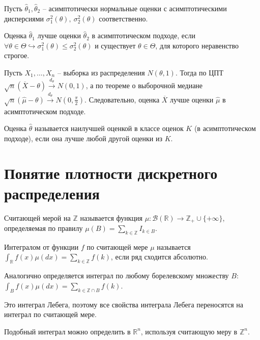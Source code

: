     Пусть $\displaystyle \hat{\theta }_{1} ,\hat{\theta }_{2}$ -- асимптотически нормальные оценки с асимптотическими дисперсиями $\displaystyle \sigma _{1}^{2}( \theta ) ,\ \sigma _{2}^{2}( \theta )$ соответственно.
    \begin{definition}
    Оценка $\displaystyle \hat{\theta }_{1}$ лучше оценки $\displaystyle \hat{\theta }_{2}$ в асимптотическом подходе, если $\displaystyle \forall \theta \in \Theta \hookrightarrow \sigma _{1}^{2}( \theta ) \leqslant \sigma _{2}^{2}( \theta )$ и существует $\displaystyle \theta \in \Theta $, для которого неравенство строгое.
    \end{definition}
    \begin{example}
    Пусть $\displaystyle X_{1} ,\dotsc ,X_{n}$ -- выборка из распределения $\displaystyle N( \theta ,1)$. Тогда по ЦПТ $\displaystyle \sqrt{n}(\overline{X} -\theta )\xrightarrow{d_{\theta }} N( 0,1)$, а по теореме о выборочной медиане $\displaystyle \sqrt{n}(\hat{\mu } -\theta )\xrightarrow{d_{\theta }} N\left( 0,\frac{\pi }{2}\right)$. Следовательно, оценка $\displaystyle \overline{X}$ лучше оценки $\displaystyle \hat{\mu }$ в асимптотическом подходе.
    \end{example}
    \begin{definition}
    Оценка $\displaystyle \hat{\theta }$ называется наилучшей оценкой в классе оценок $\displaystyle K$ (в асимптотическом подходе), если она лучше любой другой оценки из $\displaystyle K$.
    \end{definition}
    \section{Понятие плотности дискретного распределения}
    \begin{definition}
    Считающей мерой на $\displaystyle \mathbb{Z}$ называется функция $\displaystyle \mu :\mathcal{B}(\mathbb{R})\rightarrow \mathbb{Z}_{+} \cup \{+\infty \}$, определяемая по правилу $\displaystyle \mu ( B) =\sum _{k\in \mathbb{Z}} I_{k\in B}$.
    \end{definition}
    \begin{definition}
    Интегралом от функции $\displaystyle f$ по считающей мере $\displaystyle \mu $ называется $\displaystyle \int _{\mathbb{R}} f( x) \mu ( dx) =\sum _{k\in \mathbb{Z}} f( k)$, если ряд сходится абсолютно.
    \end{definition}
    Аналогично определяется интеграл по любому борелевскому множеству $\displaystyle B$: $\displaystyle \int _{B} f( x) \mu ( dx) =\sum _{k\in \mathbb{Z} \cap B} f( k)$.
    \begin{note}
    Это интеграл Лебега, поэтому все свойства интеграла Лебега переносятся на интеграл по считающей мере.
    \end{note}
    \begin{note}
    Подобный интеграл можно определить в $\displaystyle \mathbb{R}^{n}$, используя считающую меру в $\displaystyle \mathbb{Z}^{n}$.
    \end{note}